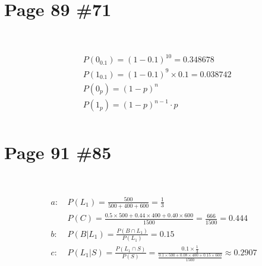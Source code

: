\documentclass{article}
\begin{document}
\newpage

\section*{Page 89 \#71}

~

\begin{align*}
    &P(0_{0.1})=(1-0.1)^{10}=0.348678\\
    &P(1_{0.1})=(1-0.1)^9\times0.1=0.038742\\
    &P(0_{p})=(1-p)^n\\
    &P(1_{p})=(1-p)^{n-1}\cdot p\\
\end{align*}

\newpage

\section*{Page 91 \#85}

~

\begin{align*}
    a:\ &P(L_1)=\frac{500}{500+400+600}=\frac{1}{3}\\
    &P(C)=\frac{0.5\times500+0.44\times 400+0.40\times 600}{1500}=\frac{666}{1500}=0.444\\
    b:\ &P(B|L_1)=\frac{P(B\cap L_1)}{P(L_1)}=0.15\\
    c:\ &P(L_1|S)=\frac{P(L_1\cap S)}{P(S)}=\frac{0.1\times \frac{1}{3}}{\frac{0.1\times 500+0.08\times 400+0.15\times 600}{1500}}\approx0.2907\\
\end{align*}
\end{document}
